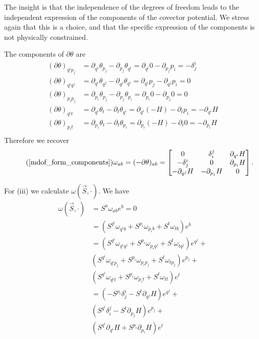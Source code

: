 \documentclass[10pt,twocolumn, nofootinbib]{revtex4-2}
\begin{document}
The insight is that the independence of the degrees of freedom leads to the independent expression of the components of the covector potential. We stress again that this is a choice, and that the specific expression of the components is not physically constrained.

The components of $\partial\theta$ are
\begin{equation}
	\begin{aligned}
		(\partial\theta)_{q^i p_j} &= \partial_{q^i}\theta_{p_j} - \partial_{p_j}\theta_{q^i} = \partial_{q^i} 0 - \partial_{p_j} p_i= - \delta^i_j \\
		(\partial\theta)_{q^i q^j} &= \partial_{q^i}\theta_{q^j} - \partial_{q^j}\theta_{q^i} = \partial_{q^i}p_j - \partial_{q^j}p_i = 0 \\
		(\partial\theta)_{p_i p_j} &= \partial_{p_i}\theta_{p_j} - \partial_{p_j}\theta_{p_i} = \partial_{p_i} 0 - \partial_{p_j} 0 = 0 \\
		(\partial\theta)_{q^i t} &= \partial_{q^i}\theta_{t} - \partial_{t}\theta_{q^i} = \partial_{q^i} (-H) - \partial_{t} p_i= - \partial_{q^i} H \\
		(\partial\theta)_{p_i t} &= \partial_{p_i}\theta_{t} - \partial_{t}\theta_{p_i} = \partial_{p_i} (-H) - \partial_{t} 0= - \partial_{p_i} H \\
	\end{aligned}
\end{equation}
Therefore we recover
\begin{equation}
	\tag*{(\ref{mdof_form_components})}
	\omega_{ab}=(-\partial\theta)_{ab} = \begin{bmatrix}
		0 & \delta^j_i & \partial_{q^i} H \\
		-\delta^i_j & 0 & \partial_{p_i} H \\
		- \partial_{q^j} H & - \partial_{p_j} H & 0
	\end{bmatrix}.
\end{equation}

For (iii) we calculate $\omega(\vec{S}, \cdot ) $. We have
\begin{equation}
\begin{aligned}
	\omega(\vec{S}, \cdot )  &= S^a \omega_{ab} e^b = 0 \\
	&= (S^{q^i}\omega_{q^ib} + S^{p_i}\omega_{p_ib} + S^{t}\omega_{tb}) e^b \\
	&= (S^{q^i}\omega_{q^iq^j} + S^{p_i}\omega_{p_iq^j} + S^{t}\omega_{tq^j}) e^{q^j} + \\
	& (S^{q^i}\omega_{q^ip_j} +  S^{p_i}\omega_{p_ip_j} + S^{t}\omega_{tp_j}) e^{p_j} + \\
	& (S^{q^i}\omega_{q^it} + S^{p_i}\omega_{p_it} + S^{t}\omega_{tt}) e^t \\
	&= (-S^{p_i}\delta^i_j - S^{t}\partial_{q^j} H ) e^{q^j} + \\
	& (S^{q^i}\delta^j_i -  S^{t}\partial_{p_j} H) e^{p_j} + \\
	& (S^{q^i} \partial_{q^i} H + S^{p_i} \partial_{p_i} H) e^t \\
\end{aligned}
\end{equation}
\end{document}
